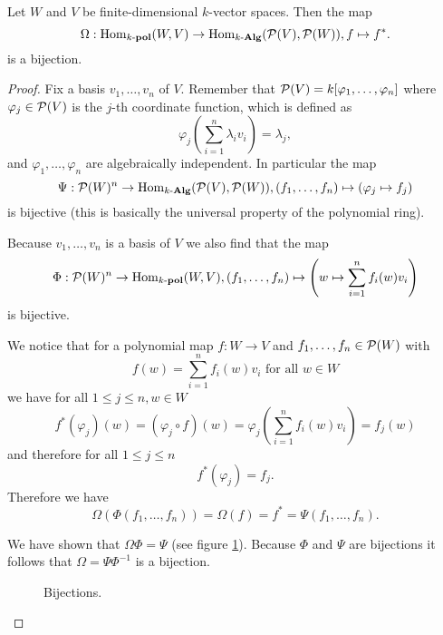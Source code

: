 \begin{prop}
 Let $W$ and $V$ be finite-dimensional $k$-vector spaces. Then the map
 \[
  \Omega : \operatorname{Hom}_{k\text{-}\mathbf{pol}}(W,V) \to \operatorname{Hom}_{k\text{-}\mathbf{Alg}}(\mathcal{P}(V), \mathcal{P}(W)), f \mapsto f^*.
 \]
 is a bijection.
\end{prop}
\begin{proof}
 Fix a basis $v_1, \ldots, v_n$ of $V$. Remember that $\mathcal{P}(V) = k[\varphi_1, \ldots, \varphi_n]$ where $\varphi_j \in \mathcal{P}(V)$ is the $j$-th coordinate function, which is defined as
 \[
  \varphi_j\left(\sum_{i=1}^n \lambda_i v_i\right) = \lambda_j,
\]
 and $\varphi_1, \ldots, \varphi_n$ are algebraically independent. In particular the map
 \[
  \Psi : \mathcal{P}(W)^n \to \operatorname{Hom}_{k\text{-}\mathbf{Alg}}(\mathcal{P}(V),\mathcal{P}(W)), (f_1, \ldots, f_n) \mapsto (\varphi_j \mapsto f_j)
 \]
 is bijective (this is basically the universal property of the polynomial ring).
 
 Because $v_1, \ldots, v_n$ is a basis of $V$ we also find that the map
 \[
  \Phi : \mathcal{P}(W)^n \to \operatorname{Hom}_{k\text{-}\mathbf{pol}}(W,V), (f_1, \ldots, f_n) \mapsto \left(w \mapsto \sum_{i=1}^n f_i(w)v_i\right)
 \]
 is bijective.
 
 We notice that for a polynomial map $f : W \to V$ and $f_1, \ldots, f_n \in \mathcal{P}(W)$ with
 \[
  f(w) = \sum_{i=1}^n f_i(w) v_i \text{ for all } w \in W
 \]
 we have for all $1 \leq j \leq n, w \in W$
 \[
  f^*(\varphi_j)(w)
  = (\varphi_j \circ f)(w)
  = \varphi_j\left(\sum_{i=1}^n f_i(w) v_i\right)
  = f_j(w)
 \]
 and therefore for all $1 \leq j \leq n$
 \[
  f^*(\varphi_j) = f_j.
 \]
 Therefore we have
 \[
  \Omega(\Phi(f_1, \ldots, f_n)) = \Omega(f) = f^* = \Psi(f_1, \ldots, f_n).
 \]
 
 We have shown that $\Omega \Phi = \Psi$ (see figure \ref{fig: bijections}). Because $\Phi$ and $\Psi$ are bijections it follows that $\Omega = \Psi \Phi^{-1}$ is a bijection.
 
 \begin{figure}\centering
  \caption{Bijections.}
  \label{fig: bijections}
 \end{figure}
\end{proof}


